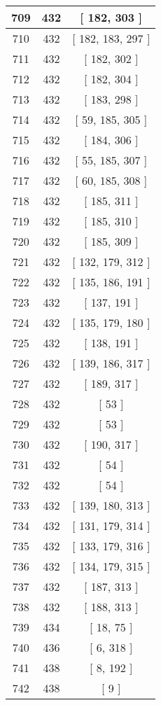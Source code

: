 \begin{center}
\begin{longtable}[H]{|| c c c ||}
\hline
709 & 432 & [ 182, 303 ] \\ 
\hline
710 & 432 & [ 182, 183, 297 ] \\ 
\hline
711 & 432 & [ 182, 302 ] \\ 
\hline
712 & 432 & [ 182, 304 ] \\ 
\hline
713 & 432 & [ 183, 298 ] \\ 
\hline
714 & 432 & [ 59, 185, 305 ] \\ 
\hline
715 & 432 & [ 184, 306 ] \\ 
\hline
716 & 432 & [ 55, 185, 307 ] \\ 
\hline
717 & 432 & [ 60, 185, 308 ] \\ 
\hline
718 & 432 & [ 185, 311 ] \\ 
\hline
719 & 432 & [ 185, 310 ] \\ 
\hline
720 & 432 & [ 185, 309 ] \\ 
\hline
721 & 432 & [ 132, 179, 312 ] \\ 
\hline
722 & 432 & [ 135, 186, 191 ] \\ 
\hline
723 & 432 & [ 137, 191 ] \\ 
\hline
724 & 432 & [ 135, 179, 180 ] \\ 
\hline
725 & 432 & [ 138, 191 ] \\ 
\hline
726 & 432 & [ 139, 186, 317 ] \\ 
\hline
727 & 432 & [ 189, 317 ] \\ 
\hline
728 & 432 & [ 53 ] \\ 
\hline
729 & 432 & [ 53 ] \\ 
\hline
730 & 432 & [ 190, 317 ] \\ 
\hline
731 & 432 & [ 54 ] \\ 
\hline
732 & 432 & [ 54 ] \\ 
\hline
733 & 432 & [ 139, 180, 313 ] \\ 
\hline
734 & 432 & [ 131, 179, 314 ] \\ 
\hline
735 & 432 & [ 133, 179, 316 ] \\ 
\hline
736 & 432 & [ 134, 179, 315 ] \\ 
\hline
737 & 432 & [ 187, 313 ] \\ 
\hline
738 & 432 & [ 188, 313 ] \\ 
\hline
739 & 434 & [ 18, 75 ] \\ 
\hline
740 & 436 & [ 6, 318 ] \\ 
\hline
741 & 438 & [ 8, 192 ] \\ 
\hline
742 & 438 & [ 9 ] \\ 

\end{longtable}
\end{center}
